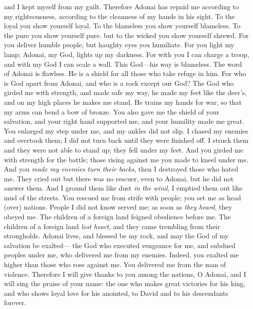\begin{biblechapter}
and I kept myself from my guilt.
\verse Therefore Adonai has repaid me according to my righteousness, 
according to the cleanness of my hands in his sight.
\verse To the loyal you show yourself loyal. 
To the blameless you show yourself blameless.
\verse To the pure you show yourself pure. 
but to the wicked you show yourself shrewd.
\verse For you deliver humble people, 
but haughty eyes you humiliate.
\verse For you light my lamp; 
Adonai, my God, lights up my darkness.
\verse For with you I can charge a troop, 
and with my God I can scale a wall.
\verse This God—his way is blameless. 
The word of Adonai is flawless. 
He is a shield for all those who take refuge in him.
\verse For who is God apart from Adonai, 
and who is a rock except our God?
\verse The God who girded me with strength, 
and made safe my way,
\verse he made my feet like the deer’s, 
and on my high places he makes me stand.
\verse He trains my hands for war, 
so that my arms can bend a bow of bronze.
\verse You also gave me the shield of your salvation, 
and your right hand supported me, 
and your humility made me great.
\verse You enlarged my step under me, 
and my ankles did not slip.
\verse I chased my enemies and overtook them; 
I did not turn back until they were finished off.
\verse I struck them and they were not able to stand up; 
they fell under my feet.
\verse And you girded me with strength for the battle; 
those rising against me you made to kneel under me.
\verse And you \textit{made my enemies turn their backs}, 
then I destroyed those who hated me.
\verse They cried out but there was no rescuer, 
even to Adonai, but he did not answer them.
\verse And I ground them like dust \textit{in the wind}, 
I emptied them out like mud of the streets.
\verse You rescued me from strife with people; 
you set me as head (over) nations. 
People I did not know served me;
\verse as soon as \textit{they heard}, they obeyed me. 
The children of a foreign land feigned obedience before me.
\verse The children of a foreign land \textit{lost heart}, 
and they came trembling from their strongholds.
\verse Adonai lives, and blessed be my rock, 
and may the God of my salvation be exalted—
\verse the God who executed vengeance for me, 
and subdued peoples under me,
\verse who delivered me from my enemies. 
Indeed, you exalted me higher than those who rose against me. 
You delivered me from the man of violence.
\verse Therefore I will give thanks to you among the nations, O Adonai, 
and I will sing the praise of your name:
\verse the one who makes great victories for his king, 
and who shows loyal love for his anointed, 
to David and to his descendants forever.
\end{biblechapter}

